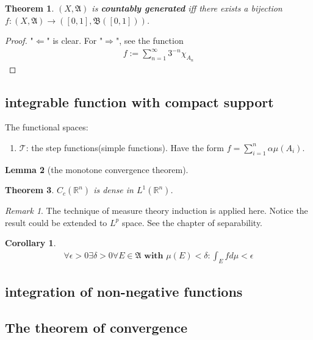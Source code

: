 \documentclass[a4paper,11pt,oneside,fleqn]{book}
\newtheorem{theorem}{Theorem}[section]
\newtheorem{corollary}{Corollary}[theorem]
\newtheorem{lemma}[theorem]{Lemma}
\theoremstyle{definition}
\theoremstyle{remark}
\newtheorem*{remark}{Remark}
\begin{document}
\begin{theorem}
	$(X, \mathfrak{A})$ is \textbf{countably generated} iff there exists a bijection $f: (X, \mathfrak{A}) \rightarrow ([0, 1], \mathfrak{B}([0, 1]))$.
\end{theorem}
\begin{proof}
	"$\Leftarrow$" is clear. For "$\Rightarrow$", see the function 
	\begin{align*}
		f:= \sum_{n = 1}^\infty 3^{-n} \chi_{A_n}
	\end{align*}
\end{proof}


\subsection{integrable function with compact support}
The functional spaces:
\begin{enumerate}
	\item $\mathcal{T}$: the step functions(simple functions). Have the form $f = \sum_{i = 1}^n \alpha \mu(A_i)$. 
\end{enumerate}
\begin{lemma}[the monotone convergence theorem]
	
\end{lemma}

\begin{theorem}
	$C_c(\mathbb{R}^n)$ is dense in $L^1(\mathbb{R}^n)$.
\end{theorem}
\begin{remark}
The technique of measure theory induction is applied here. Notice the result could be extended to $L^p$ space. See the chapter of separability.	
\end{remark}

\begin{corollary}
	\begin{align*}
		\forall \epsilon > 0 \exists \delta > 0 \forall E \in \mathfrak{A} \textbf{ with } \mu(E) < \delta:
		\int_E f d\mu < \epsilon
	\end{align*}
\end{corollary}


\subsection{integration of non-negative functions}

\subsection{The theorem of convergence}
\end{document}
